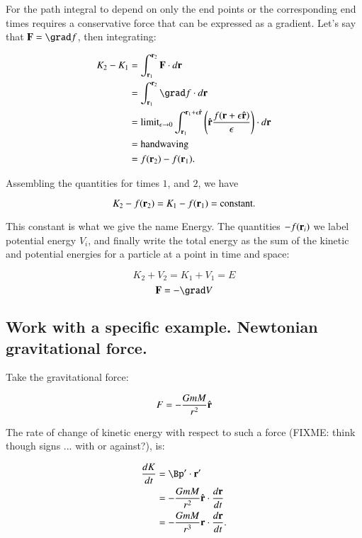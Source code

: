 For the path integral to depend on only the end points or the corresponding end times requires a conservative force that can be expressed as a gradient.
Let's say that $\BF = \grad f$, then integrating:

\begin{align*}
K_2 - K_1 
&= \int_{\Br_1}^{\Br_2} \BF \cdot d\Br \\
&= \int_{\Br_1}^{\Br_2} \grad f \cdot d\Br \\
&= {\text{limit}}_{\epsilon \rightarrow 0} \int_{\Br_1}^{\Br_1 + \epsilon\rcap}
   \left(\rcap \frac{f(\Br + \epsilon \rcap)}{\epsilon}\right)
      \cdot d\Br \\
&= \text{handwaving} \\
&= f(\Br_2) - f(\Br_1).
\end{align*}

Assembling the quantities for times $1$, and $2$, we have

\begin{equation}
K_2 -f(\mathbf{r}_2) = K_1 - f(\mathbf{r}_1) = \text{constant}.
\end{equation}

This constant is what we give the name Energy.  The quantities $-f(\mathbf{r}_i)$ we label potential energy $V_i$, and finally write the total energy as the sum of the kinetic and potential energies for a particle at a point in time and space:

\begin{equation}
K_2 + V_2 = K_1 + V_1 = E
\end{equation}
\begin{equation}
\BF = -\grad V
\end{equation}

\subsection{Work with a specific example.  Newtonian gravitational force.}

Take the gravitational force:

\begin{equation}
F = -\frac{GmM}{r^2} \hat{\mathbf{r}}
\end{equation}

The rate of change of kinetic energy with respect to such a force (FIXME: think though signs ... with or against?), is:

\begin{align*}
\frac{dK}{dt} 
&= \Bp' \cdot \Br' \\
&= -\frac{GmM}{r^2} \rcap \cdot \frac{d\Br}{dt} \\
&= -\frac{GmM}{r^3} \Br \cdot \frac{d\Br}{dt}.
\end{align*}

